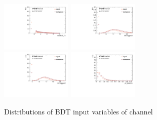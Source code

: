 \begin{figure}[htbp]
 \includegraphics[width=0.3\textwidth]{figures/VBF/BDT_mindRJ2_4cen.pdf}
 \includegraphics[width=0.3\textwidth]{figures/VBF/BDT_NTrk500_J1_4cen.pdf}\\
 \includegraphics[width=0.3\textwidth]{figures/VBF/BDT_NTrk500_J2_4cen.pdf}
 \includegraphics[width=0.3\textwidth]{figures/VBF/BDT_pTBalance_4cen.pdf}\\

\caption{Distributions of BDT input variables of \fourcentral channel}
  \label{fig:vbf-BDTInputs4cen}
\end{figure}


